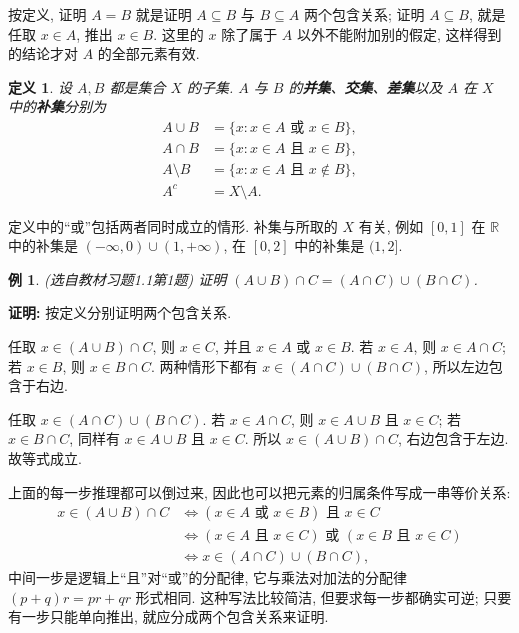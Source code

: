 \documentclass[UTF8,openany]{ctexbook}
\theoremstyle{chinesetextbook}
\newtheorem{definition}{定义}[section]
\newtheorem{example}{例}[section]
\newenvironment{cnproof}{\par\indent\textbf{证明:} \ignorespaces}{\par}
\begin{document}
按定义, 证明 $A=B$ 就是证明 $A\subseteq B$ 与 $B\subseteq A$ 两个包含关系; 证明 $A\subseteq B$, 就是任取 $x\in A$, 推出 $x\in B$. 这里的 $x$ 除了属于 $A$ 以外不能附加别的假定, 这样得到的结论才对 $A$ 的全部元素有效.
\begin{definition}
设 $A,B$ 都是集合 $X$ 的子集. $A$ 与 $B$ 的\textbf{并集}、\textbf{交集}、\textbf{差集}以及 $A$ 在 $X$ 中的\textbf{补集}分别为
\[
\begin{aligned}
A\cup B&=\{x:x\in A\text{ 或 }x\in B\},\\
A\cap B&=\{x:x\in A\text{ 且 }x\in B\},\\
A\setminus B&=\{x:x\in A\text{ 且 }x\notin B\},\\
A^c&=X\setminus A.
\end{aligned}
\]
\end{definition}
定义中的“或”包括两者同时成立的情形. 补集与所取的 $X$ 有关, 例如 $[0,1]$ 在 $\mathbb R$ 中的补集是 $(-\infty,0)\cup(1,+\infty)$, 在 $[0,2]$ 中的补集是 $(1,2]$.
\begin{example}
\textnormal{(选自教材习题1.1第1题)} 证明 $(A\cup B)\cap C=(A\cap C)\cup(B\cap C)$.
\end{example}
\begin{cnproof}
按定义分别证明两个包含关系.

任取 $x\in(A\cup B)\cap C$, 则 $x\in C$, 并且 $x\in A$ 或 $x\in B$. 若 $x\in A$, 则 $x\in A\cap C$; 若 $x\in B$, 则 $x\in B\cap C$. 两种情形下都有 $x\in(A\cap C)\cup(B\cap C)$, 所以左边包含于右边.

任取 $x\in(A\cap C)\cup(B\cap C)$. 若 $x\in A\cap C$, 则 $x\in A\cup B$ 且 $x\in C$; 若 $x\in B\cap C$, 同样有 $x\in A\cup B$ 且 $x\in C$. 所以 $x\in(A\cup B)\cap C$, 右边包含于左边. 故等式成立.
\end{cnproof}
上面的每一步推理都可以倒过来, 因此也可以把元素的归属条件写成一串等价关系:
\[
\begin{aligned}
x\in(A\cup B)\cap C
&\iff (x\in A\text{ 或 }x\in B)\text{ 且 }x\in C\\
&\iff (x\in A\text{ 且 }x\in C)\text{ 或 }(x\in B\text{ 且 }x\in C)\\
&\iff x\in(A\cap C)\cup(B\cap C),
\end{aligned}
\]
中间一步是逻辑上“且”对“或”的分配律, 它与乘法对加法的分配律 $(p+q)r=pr+qr$ 形式相同. 这种写法比较简洁, 但要求每一步都确实可逆; 只要有一步只能单向推出, 就应分成两个包含关系来证明.
\end{document}

